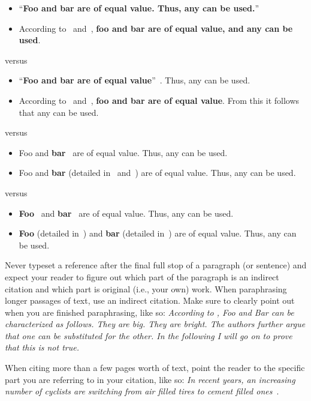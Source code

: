 \documentclass[]{ccs-thesis}
\begin{document}
\begin{itemize}
\item ``\textbf{Foo and bar are of equal value. Thus, any can be used.}''~\cite{akyildiz2002survey,arampatzis2005survey}
\item According to~\cite{akyildiz2002survey} and~\cite{arampatzis2005survey}, \textbf{foo and bar are of equal value, and any can be used}.
\end{itemize}
versus
\begin{itemize}
\item ``\textbf{Foo and bar are of equal value}''~\cite{akyildiz2002survey,arampatzis2005survey}. Thus, any can be used.
\item According to~\cite{akyildiz2002survey} and~\cite{arampatzis2005survey}, \textbf{foo and bar are of equal value}. From this it follows that any can be used.
\end{itemize}
versus
\begin{itemize}
\item Foo and \textbf{bar}~\cite{akyildiz2002survey,arampatzis2005survey} are of equal value. Thus, any can be used.
\item Foo and \textbf{bar} (detailed in~\cite{akyildiz2002survey} and~\cite{arampatzis2005survey}) are of equal value. Thus, any can be used.
\end{itemize}
versus
\begin{itemize}
\item \textbf{Foo}~\cite{akyildiz2002survey} and \textbf{bar}~\cite{arampatzis2005survey} are of equal value. Thus, any can be used.
\item \textbf{Foo} (detailed in~\cite{akyildiz2002survey}) and \textbf{bar} (detailed in~\cite{arampatzis2005survey}) are of equal value. Thus, any can be used.
\end{itemize}

Never typeset a reference after the final full stop of a paragraph (or sentence) and expect your reader to figure out which part of the paragraph is an indirect citation and which part is original (i.e., your own) work.
When paraphrasing longer passages of text, use an indirect citation.
Make sure to clearly point out when you are finished paraphrasing, like so:
\emph{According to \textcite{akyildiz2002survey}, Foo and Bar can be characterized as follows. They are big. They are bright. The authors further argue that one can be substituted for the other. In the following I will go on to prove that this is not true.}

When citing more than a few pages worth of text, point the reader to the specific part you are referring to in your citation, like so:
\emph{In recent years, an increasing number of cyclists are switching from air filled tires to cement filled ones~\cite[Table IV]{dietrich2009lifetime}}.
\end{document}
